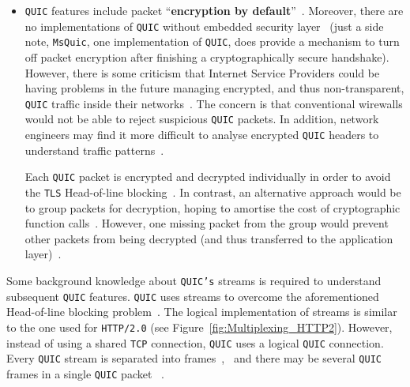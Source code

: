 \documentclass[12pt,a4paper,twoside,openright]{report}
\begin{document}
\begin{itemize}
 
  \item \texttt{QUIC} features include packet \enquote{\textbf{encryption by default}}~\cite{the-road-to-quic}.
  Moreover, there are no implementations of \texttt{QUIC} without embedded security layer~\cite{head-of-line-blocking-in-quic-and-http-3-the-details}
  (just a side note, \texttt{MsQuic}, one implementation of \texttt{QUIC}, does provide a mechanism to turn off packet encryption after finishing a cryptographically secure handshake).
  However, there is some criticism that Internet Service Providers could be having problems in the future managing encrypted, and thus non-transparent, \texttt{QUIC} traffic inside their networks~\cite{why-is-googles-quic-leaving-network-operators-in-the-dark}.
  The concern is that conventional wirewalls would not be able to reject suspicious \texttt{QUIC} packets.
  In addition, network engineers may find it more difficult to analyse encrypted \texttt{QUIC} headers to understand traffic patterns~\cite{2017-12-18-transport-header-encryption}.
  
  Each \texttt{QUIC} packet is encrypted and decrypted individually in order to avoid the \texttt{TLS} Head-of-line blocking~\cite{head-of-line-blocking-in-quic-and-http-3-the-details}.
  In contrast, an alternative approach would be to group packets for decryption, hoping to amortise the cost of cryptographic function calls~\cite{head-of-line-blocking-in-quic-and-http-3-the-details, optimizing-tls-record-size-and-buffering-latency}.
  However, one missing packet from the group would prevent other packets from being decrypted (and thus transferred to the application layer)~\cite{head-of-line-blocking-in-quic-and-http-3-the-details}.


  
  \end{itemize}
  Some background knowledge about \texttt{QUIC's} streams is required to understand subsequent \texttt{QUIC} features.
  \texttt{QUIC} uses streams to overcome the aforementioned Head-of-line blocking problem~\cite{UnderstandQUIC}.
  The logical implementation of streams is similar to the one used for \texttt{HTTP/2.0} (see Figure~\ref{fig:Multiplexing_HTTP2}).
  However, instead of using a shared \texttt{TCP} connection, \texttt{QUIC} uses a logical \texttt{QUIC} connection.
  Every \texttt{QUIC} stream is separated into frames~\cite{UnderstandQUIC},~\cite[Chapter~2.1]{ ietf-quic-transport-draft-32} and there may be several \texttt{QUIC} frames in a single \texttt{QUIC} packet ~\cite[Chapter~1]{ ietf-quic-transport-draft-32}.
\end{document}
